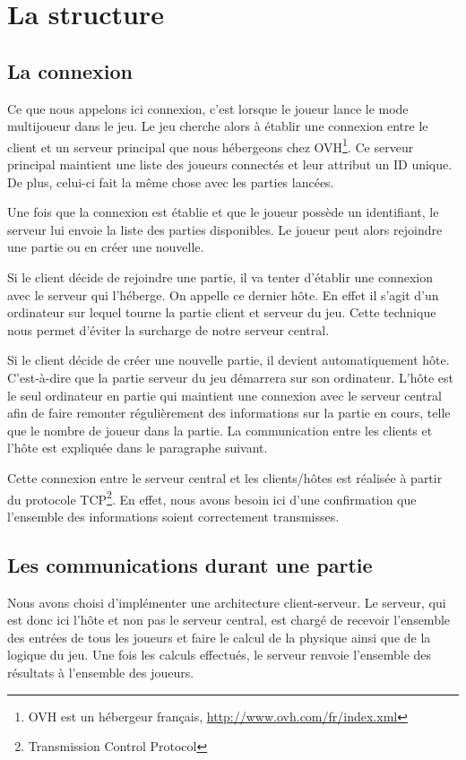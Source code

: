 \documentclass[11pt]{report}
\begin{document}
\section{La structure}

\subsection{La connexion}

Ce que nous appelons ici connexion, c'est lorsque le joueur lance le mode multijoueur dans le jeu. Le jeu cherche alors à établir une connexion entre le client et un serveur principal que nous hébergeons chez OVH\footnote{OVH est un hébergeur français, \url{http://www.ovh.com/fr/index.xml}}. Ce serveur principal maintient une liste des joueurs connectés et leur attribut un ID unique. De plus, celui-ci fait la même chose avec les parties lancées.

Une fois que la connexion est établie et que le joueur possède un identifiant, le serveur lui envoie la liste des parties disponibles. Le joueur peut alors rejoindre une partie ou en créer une nouvelle.

Si le client décide de rejoindre une partie, il va tenter d'établir une connexion avec le serveur qui l'héberge. On appelle ce dernier hôte. En effet il s'agit d'un ordinateur sur lequel tourne la partie client et serveur du jeu. Cette technique nous permet d'éviter la surcharge de notre serveur central.

Si le client décide de créer une nouvelle partie, il devient automatiquement hôte. C'est-à-dire que la partie serveur du jeu démarrera sur son ordinateur. L'hôte est le seul ordinateur en partie qui maintient une connexion avec le serveur central afin de faire remonter régulièrement des informations sur la partie en cours, telle que le nombre de joueur dans la partie. La communication entre les clients et l'hôte est expliquée dans le paragraphe suivant.

Cette connexion entre le serveur central et les clients/hôtes est réalisée à partir du protocole TCP\footnote{Transmission Control Protocol}. En effet, nous avons besoin ici d'une confirmation que l'ensemble des informations soient correctement transmisses.

\subsection{Les communications durant une partie}

Nous avons choisi d'implémenter une architecture client-serveur. Le serveur, qui est donc ici l'hôte et non pas le serveur central, est chargé de recevoir l'ensemble des entrées de tous les joueurs et faire le calcul de la physique ainsi que de la logique du jeu. Une fois les calculs effectués, le serveur renvoie l'ensemble des résultats à l'ensemble des joueurs.
\end{document}
